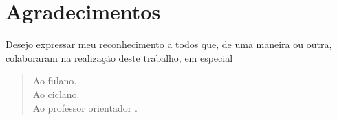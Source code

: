 \thispagestyle{plain}

\section*{Agradecimentos}

\noindent Desejo expressar meu reconhecimento a todos que, de uma maneira ou outra, colaboraram na realização deste trabalho, em especial

\begin{quote}
  Ao fulano.\\
  Ao ciclano.\\
  Ao professor orientador .

\end{quote}

\cleardoublepageempty
